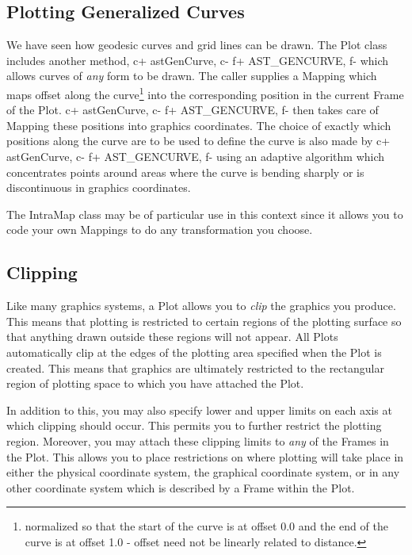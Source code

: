 \documentclass[twoside,11pt]{starlink}
\begin{document}
\subsection{\label{ss:plottinggeneralizedcurves}Plotting Generalized Curves}
We have seen how geodesic curves and grid lines can be drawn. The Plot
class includes another method,
c+
astGenCurve,
c-
f+
AST\_GENCURVE,
f-
which allows curves of \emph{any} form to be drawn. The caller supplies a
Mapping which maps offset along the curve\footnote{normalized so that the
start of the curve is at offset 0.0 and the end of the curve is at offset
1.0 - offset need not be linearly related to distance.} into the
corresponding position in the current Frame of the Plot.
c+
astGenCurve,
c-
f+
AST\_GENCURVE,
f-
then takes care of Mapping these positions into graphics coordinates. The
choice of exactly which positions along the curve are to be used to
define the curve is also made by
c+
astGenCurve,
c-
f+
AST\_GENCURVE,
f-
using an adaptive algorithm which concentrates points around areas where
the curve is bending sharply or is discontinuous in graphics coordinates.

The IntraMap class may be of particular use in this context since it allows
you to code your own Mappings to do any transformation you choose.


\subsection{\label{ss:clipping}Clipping}

Like many graphics systems, a Plot allows you to \emph{clip} the graphics
you produce. This means that plotting is restricted to certain regions
of the plotting surface so that anything drawn outside these regions
will not appear.  All Plots automatically clip at the edges of the
plotting area specified when the Plot is created. This means that
graphics are ultimately restricted to the rectangular region of
plotting space to which you have attached the Plot.

In addition to this, you may also specify lower and upper limits on
each axis at which clipping should occur. This permits you to further
restrict the plotting region. Moreover, you may attach these clipping
limits to \emph{any} of the Frames in the Plot. This allows you to
place restrictions on where plotting will take place in either the
physical coordinate system, the graphical coordinate system, or in any
other coordinate system which is described by a Frame within the Plot.
\end{document}
